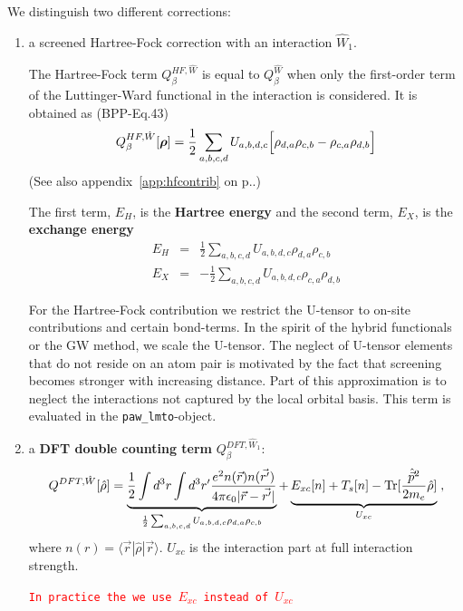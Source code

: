 \documentclass[11pt,a4paper]{report}
\newcommand{\petertt}[1]{\textcolor{red}{\texttt{#1}}}
\begin{document}
We distinguish two different corrections:
\begin{enumerate}
\item a screened Hartree-Fock correction with an interaction
  $\hat{W}_1$. 

  The Hartree-Fock term $Q^{HF,\hat{W}}_{\beta}$ is equal to
  $Q^{\hat{W}}_\beta$ when only the first-order term of the
  Luttinger-Ward functional in the interaction is considered.  It is
  obtained as (BPP-Eq.43)
  \begin{eqnarray}
  Q_{\beta}^{HF,\hat{W}}[\bm{\rho}]
  =\frac{1}{2}\sum_{a,b,c,d}U_{a,b,d,c}
   \Bigl[\rho_{d,a}\rho_{c,b}-\rho_{c,a}\rho_{d,b}\Bigr]
  \end{eqnarray}
  (See also appendix~\ref{app:hfcontrib} on p.\pageref{app:hfcontrib}.)

  The first term, $E_H$, is the \textbf{Hartree energy} and the second term, $E_X$, is the \textbf{exchange
    energy}
  \begin{eqnarray}
    E_{H}& =&\frac{1}{2}\sum_{a,b,c,d}U_{a,b,d,c}\rho_{d,a}\rho_{c,b}
   \nonumber\\
    E_{X}& =&-\frac{1}{2}\sum_{a,b,c,d}U_{a,b,d,c}\rho_{c,a}\rho_{d,b}
  \end{eqnarray}

  For the Hartree-Fock contribution we restrict the U-tensor to on-site
  contributions and certain bond-terms. In the spirit of the hybrid
  functionals or the GW method, we scale the U-tensor. The neglect of
  U-tensor elements that do not reside on an atom pair is motivated by
  the fact that screening becomes stronger with increasing
  distance. Part of this approximation is to neglect the interactions
  not captured by the local orbital basis. This term is evaluated in
  the \verb|paw_lmto|-object.
%
\item a \textbf{DFT double counting term} $Q^{DFT,\hat{W}_1}_\beta$:
  \begin{eqnarray}
  Q^{DFT,\hat{W}}[\hat{\rho}]=
  \underbrace{\frac{1}{2}\int d^3r\int d^3r'
  \frac{e^2n(\vec{r})n(\vec{r'})}{4\pi\epsilon_0|\vec{r}-\vec{r'}|}
}_{\frac{1}{2}\sum_{a,b,c,d}U_{a,b,d,c}\rho_{d,a}\rho_{c,b}}
  +\underbrace{E_{xc}[n]+T_s[n]
  -\mathrm{Tr}[\frac{\hat{\vec{p}}^2}{2m_e}\hat{\rho}]}_{U_{xc}}\;,
  \end{eqnarray}
 where $n(r)=\langle\vec{r}|\hat{\rho}|\vec{r}\rangle$.  $U_{xc}$ is
 the interaction part at full interaction strength.

  \petertt{In practice the we use $E_{xc}$ instead of $U_{xc}$}


\end{enumerate}
\end{document}
